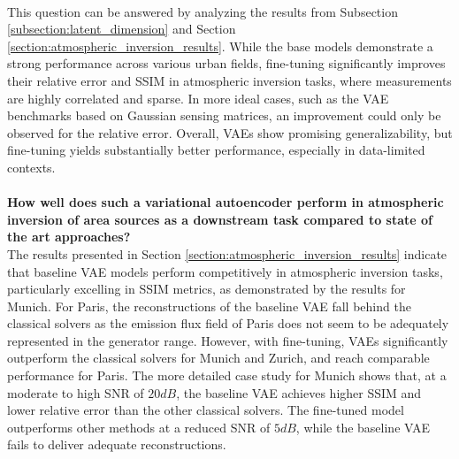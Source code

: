\\
This question can be answered by analyzing the results from Subsection \ref{subsection:latent_dimension} and Section \ref{section:atmospheric_inversion_results}.
While the base models demonstrate a strong performance across various urban fields, fine-tuning significantly improves their relative error and \gls{SSIM} in atmospheric inversion tasks, where measurements are highly correlated and sparse.
In more ideal cases, such as the VAE benchmarks based on Gaussian sensing matrices, an improvement could only be observed for the relative error.
Overall, \gls{VAE}s show promising generalizability, but fine-tuning yields substantially better performance, especially in data-limited contexts.
\\\\
\textbf{How well does such a variational autoencoder perform in atmospheric inversion of area sources as a downstream task compared to state of the art approaches?}
\\
The results presented in Section \ref{section:atmospheric_inversion_results} indicate that baseline \gls{VAE} models perform competitively in atmospheric inversion tasks, particularly excelling in \gls{SSIM} metrics, as demonstrated by the results for Munich.
For Paris, the reconstructions of the baseline \gls{VAE} fall behind the classical solvers as the emission flux field of Paris does not seem to be adequately represented in the generator range.
However, with fine-tuning, \gls{VAE}s significantly outperform the classical solvers for Munich and Zurich, and reach comparable performance for Paris.
The more detailed case study for Munich shows that, at a moderate to high \gls{SNR} of $20 \unit{dB}$, the baseline \gls{VAE} achieves higher \gls{SSIM} and lower relative error than the other classical solvers.
The fine-tuned model outperforms other methods at a reduced \gls{SNR} of $5 \unit{dB}$, while the baseline \gls{VAE} fails to deliver adequate reconstructions.
